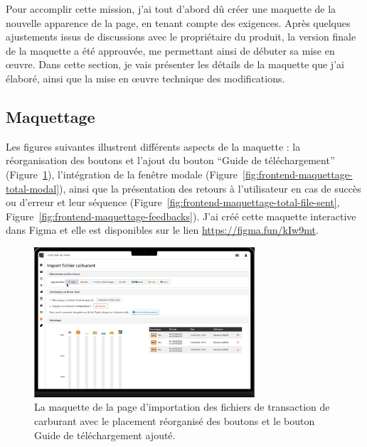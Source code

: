 Pour accomplir cette mission, j'ai tout d'abord dû créer une maquette de la nouvelle apparence de la page, en tenant compte des exigences. Après quelques ajustements issus de discussions avec le propriétaire du produit, la version finale de la maquette a été approuvée, me permettant ainsi de débuter sa mise en œuvre. Dans cette section, je vais présenter les détails de la maquette que j'ai élaboré, ainsi que la mise en œuvre technique des modifications.

\subsection{Maquettage}

Les figures suivantes illustrent différents aspects de la maquette : la réorganisation des boutons et l'ajout du bouton \foreignquote{french}{Guide de téléchargement} (Figure~\ref{fig:frontend-maquettage-total-buttons}), l'intégration de la fenêtre modale (Figure~\ref{fig:frontend-maquettage-total-modal}), ainsi que la présentation des retours à l'utilisateur en cas de succès ou d'erreur et leur séquence (Figure~\ref{fig:frontend-maquettage-total-file-sent}, Figure~\ref{fig:frontend-maquettage-feedbacks}). J'ai créé cette maquette interactive dans Figma et elle est disponibles sur le lien \url{https://figma.fun/kIw9mt}.

\begin{figure}[ht]
    \centering
    \includegraphics[width=0.73\textwidth]{img/frontend-maquettage-total-buttons}
    \caption{La maquette de la page d'importation des fichiers de transaction de carburant avec le placement réorganisé des boutons et le bouton Guide de téléchargement ajouté.}
    \label{fig:frontend-maquettage-total-buttons}
\end{figure}

